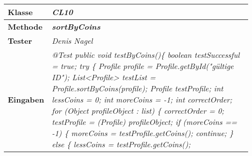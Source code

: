 \begin{longtable}{|p{4cm}|p{11cm}|}
\hline
\textbf{Klasse} & \textit{\textbf{CL10}} \\
\hline
\textbf{Methode} & \textit{\textbf{sortByCoins}} \\
\hline
\textbf{Tester} & \textit{Denis Nagel} \\
\hline
\textbf{Eingaben} & \textit{
@Test \newline
public void testByCoins()\{ \newline
\hspace*{3mm}    boolean testSuccessful = true; \newline
\hspace*{3mm}    try \{ \newline
\hspace*{6mm}      	 Profile profile = Profile.getById("gültige ID"); \newline
\hspace*{6mm}        List<Profile> testList = Profile.sortByCoins(profile); \newline
\hspace*{6mm}        Profile testProfile; \newline
\hspace*{6mm}        int lessCoins = 0; \newline
\hspace*{6mm}        int moreCoins = -1; \newline
\hspace*{6mm}        int correctOrder; \newline
\hspace*{6mm}        for (Object profileObject : list) \{ \newline
\hspace*{9mm}            correctOrder = 0; \newline
\hspace*{9mm}            testProfile = (Profile) profileObject; \newline
\hspace*{9mm}            if (moreCoins == -1) \{ \newline
\hspace*{12mm}                moreCoins = testProfile.getCoins(); \newline
\hspace*{12mm}                continue; \newline
\hspace*{9mm}            \} else \{ \newline
\hspace*{12mm}                lessCoins = testProfile.getCoins(); \newline
}
\end{longtable}
